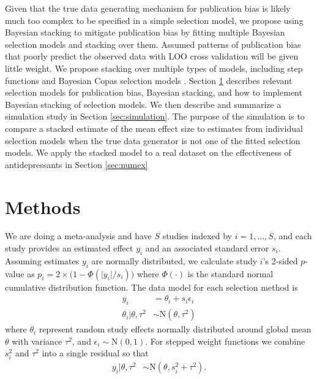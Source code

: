 \documentclass[12pt]{article}   	%
\numberwithin{equation}{section}
\begin{document}
Given that the true data generating mechanism for publication bias is likely much too complex to be specified in a simple selection model, we propose using Bayesian stacking to mitigate publication bias by fitting multiple Bayesian selection models and stacking over them. Assumed patterns of publication bias that poorly predict the observed data with LOO cross validation will be given little weight. We propose stacking over multiple types of models, including step functions \citep{vevea1995pubbias} and Bayesian Copas selection models \citet{mavridis2013copas, bai2020}. Section \ref{sec:methods} describes relevant selection models for publication bias, Bayesian stacking, and how to implement Bayesian stacking of selection models. We then describe and summarize a simulation study in Section \ref{sec:simulation}. The purpose of the simulation is to compare a stacked estimate of the mean effect size to estimates from individual selection models when the true data generator is not one of the fitted selection models. We apply the stacked model to a real dataset on the effectiveness of antidepressants in Section \ref{sec:numex}

\section{Methods} \label{sec:methods}

We are doing a meta-analysis and have $S$ studies indexed by $i = 1, \dots, S$, and each study provides an estimated effect $y_i$ and an associated standard error $s_i$. Assuming estimates $y_i$ are normally distributed, we calculate study $i$'s 2-sided $p$-value as $p_i = 2 \times \big(1 - \Phi(\vert y_i \vert / s_i)\big)$ where $\Phi(\cdot)$ is the standard normal cumulative distribution function. The data model for each selection method is
\begin{align}
y_i & = \theta_i + s_i \epsilon_i \label{eq:y} \\
\theta_i \vert \theta, \tau ^ 2 & \sim \mbox{N}(\theta, \tau ^ 2) \label{eq:thetai}
\end{align}
where $\theta_i$ represent random study effects normally distributed around global mean $\theta$ with variance $\tau^2$, and $\epsilon_i \sim \text{N}(0, 1)$. For stepped weight functions we combine $s_i^2$ and $\tau^2$ into a single residual so that
\begin{align}
y_i \vert \theta, \tau^2 &\sim \text{N}(\theta, s_i^2 + \tau^2).
\end{align}
\end{document}
